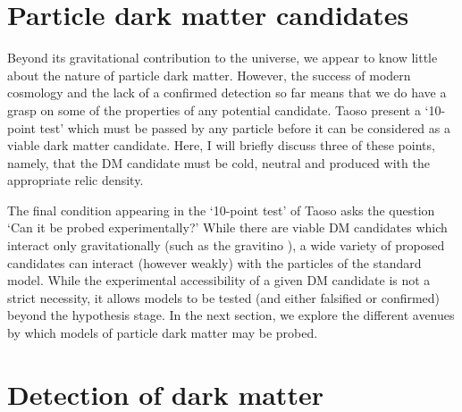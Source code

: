 
\section{Particle dark matter candidates}

Beyond its gravitational contribution to the universe, we appear to know little about the nature of particle dark matter. However, the success of modern cosmology and the lack of a confirmed detection so far means that we do have a grasp on some of the properties of any potential candidate. Taoso \etal \cite{Taoso:2008} present a `10-point test' which must be passed by any particle before it can be considered as a viable dark matter candidate. Here, I will briefly discuss three of these points, namely, that the DM candidate must be cold, neutral and produced with the appropriate relic density.


The final condition appearing in the `10-point test' of Taoso \etal asks the question `Can it be probed experimentally?' While there are viable DM candidates which interact only gravitationally (such as the gravitino ), a wide variety of proposed candidates can interact (however weakly) with the particles of the standard model. While the experimental accessibility of a given DM candidate is not a strict necessity, it allows models to be tested (and either falsified or confirmed) beyond the hypothesis stage. In the next section, we explore the different avenues by which models of particle dark matter may be probed.

\section{Detection of dark matter}




